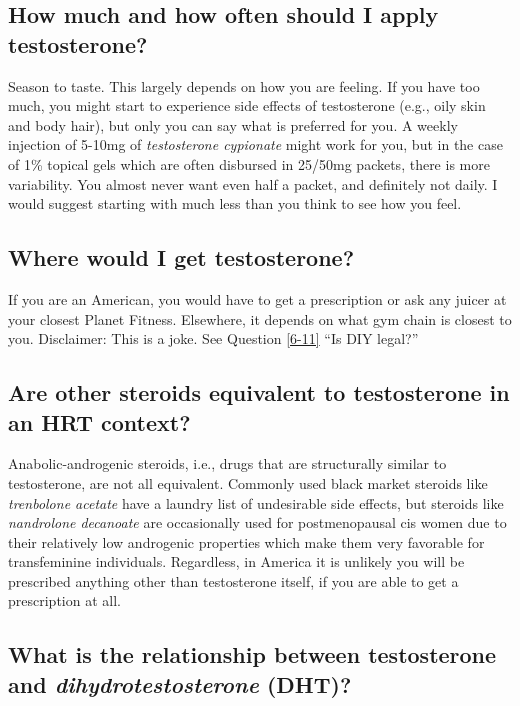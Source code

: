 \documentclass{article}
\begin{document}
{{\subsection{How much and how often should I apply testosterone?}

Season to taste. This largely depends on how you are feeling. If you have too much, you might start to experience side effects of testosterone (e.g., oily skin and body hair), but only you can say what is preferred for you. A weekly injection of 5-10mg of \textit{testosterone cypionate} might work for you, but in the case of 1\% topical gels which are often disbursed in 25/50mg packets, there is more variability. You almost never want even half a packet, and definitely not daily. I would suggest starting with much less than you think to see how you feel.

\subsection{Where would I get testosterone?}

If you are an American, you would have to get a prescription or ask any juicer at your closest Planet Fitness. Elsewhere, it depends on what gym chain is closest to you. Disclaimer: This is a joke. See Question \ref{6-11} “Is DIY legal?”

\subsection{Are other steroids equivalent to testosterone in an HRT context?}

Anabolic-androgenic steroids, i.e., drugs that are structurally similar to testosterone, are not all equivalent. Commonly used black market steroids like \textit{trenbolone acetate} have a laundry list of undesirable side effects, but steroids like \textit{nandrolone decanoate }are occasionally used for postmenopausal cis women due to their relatively low androgenic properties which make them very favorable for transfeminine individuals. Regardless, in America it is unlikely you will be prescribed anything other than testosterone itself, if you are able to get a prescription at all.

\subsection{What is the relationship between testosterone and \textit{dihydrotestosterone} (DHT)?}

}}
\end{document}
